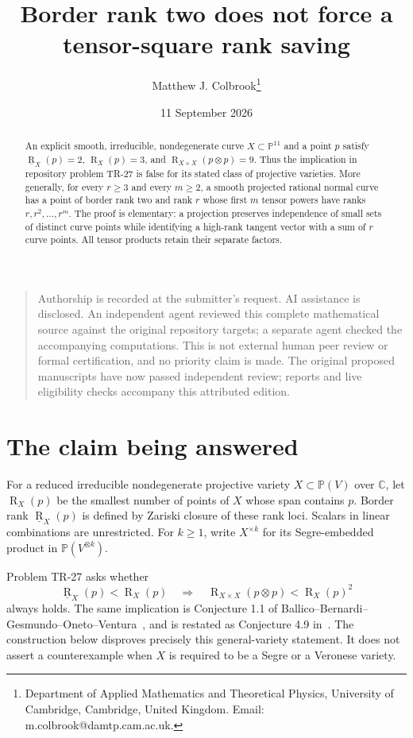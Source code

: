 \documentclass[11pt]{article}
\title{Border rank two does not force a tensor-square rank saving}
\author{Matthew J. Colbrook\thanks{Department of Applied Mathematics and Theoretical Physics, University of Cambridge, Cambridge, United Kingdom. Email: m.colbrook@damtp.cam.ac.uk.}}
\date{11 September 2026}
\theoremstyle{remark}\newtheorem{remark}[theorem]{Remark}
\newcommand{\C}{\mathbb C}
\newcommand{\PP}{\mathbb P}
\newcommand{\rk}{\operatorname{R}}
\newcommand{\brk}{\underline{\operatorname{R}}}
\begin{document}
\maketitle


\begin{quote}\small
Authorship is recorded at the submitter's request. AI assistance is disclosed. An independent agent reviewed this complete mathematical source against the original repository targets; a separate agent checked the accompanying computations. This is not external human peer review or formal certification, and no priority claim is made. The original proposed manuscripts have now passed independent review; reports and live eligibility checks accompany this attributed edition.
\end{quote}
\begin{abstract}
An explicit smooth, irreducible, nondegenerate curve $X\subset\PP^{11}$ and a point $p$ satisfy
$\brk_X(p)=2$, $\rk_X(p)=3$, and $\rk_{X\times X}(p\otimes p)=9$.
Thus the implication in repository problem TR-27 is false for its stated class of projective varieties.
More generally, for every $r\geq3$ and every $m\geq2$, a smooth projected rational normal curve has a point of border rank two and rank $r$ whose first $m$ tensor powers have ranks $r,r^2,\ldots,r^m$.
The proof is elementary: a projection preserves independence of small sets of distinct curve points while identifying a high-rank tangent vector with a sum of $r$ curve points.
All tensor products retain their separate factors.
\end{abstract}

\section{The claim being answered}
For a reduced irreducible nondegenerate projective variety $X\subset\PP(V)$ over $\C$, let $\rk_X(p)$ be the smallest number of points of $X$ whose span contains $p$. Border rank $\brk_X(p)$ is defined by Zariski closure of these rank loci. Scalars in linear combinations are unrestricted. For $k\geq1$, write $X^{\times k}$ for its Segre-embedded product in $\PP(V^{\otimes k})$.

Problem TR-27 asks whether
\begin{equation}\label{eq:claim}
 \brk_X(p)<\rk_X(p)\quad\Longrightarrow\quad
 \rk_{X\times X}(p\otimes p)<\rk_X(p)^2
\end{equation}
always holds. The same implication is Conjecture 1.1 of Ballico--Bernardi--Gesmundo--Oneto--Ventura~\cite{BBGOV}, and is restated as Conjecture 4.9 in~\cite{OV}. The construction below disproves precisely this general-variety statement. It does not assert a counterexample when $X$ is required to be a Segre or a Veronese variety.
\end{document}
